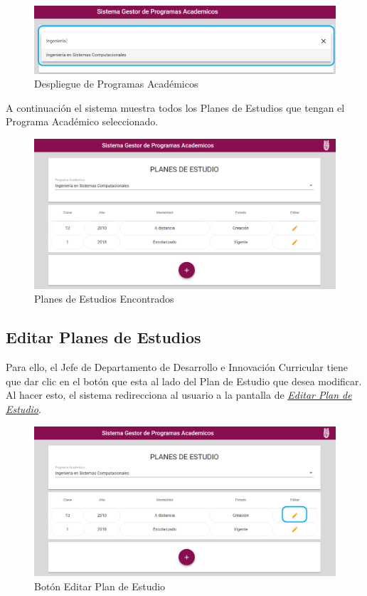 \begin{figure}[!hbtp]
	\centering
	\hypertarget{academico2}{\includegraphics[width=0.7\linewidth]{images/SP4-GPE/programaD}}
	\caption{Despliegue de Programas Académicos}
	\label{academico2}
\end{figure}

A continuación el sistema muestra todos los Planes de Estudios que tengan el Programa Académico seleccionado.
\begin{figure}[!hbtp]
	\centering
	\hypertarget{planes}{\includegraphics[width=0.7\linewidth]{images/SP4-GPE/consultar}}
	\caption{Planes de Estudios Encontrados}
	\label{planes}
\end{figure}
\newpage
\subsection{Editar Planes de Estudios}

Para ello, el Jefe de Departamento de Desarrollo e Innovación Curricular tiene que dar clic en el botón  que esta al lado del Plan de Estudio que desea modificar. Al hacer esto, el sistema redirecciona al usuario a la pantalla de \hyperlink{editarPE}{\textit{Editar Plan de Estudio}}.

\begin{figure}[!hbtp]
	\centering
	\hypertarget{editar}{\includegraphics[width=0.7\linewidth]{images/SP4-GPE/editarC}}
	\caption{Botón Editar Plan de Estudio}
	\label{editar}
\end{figure}

